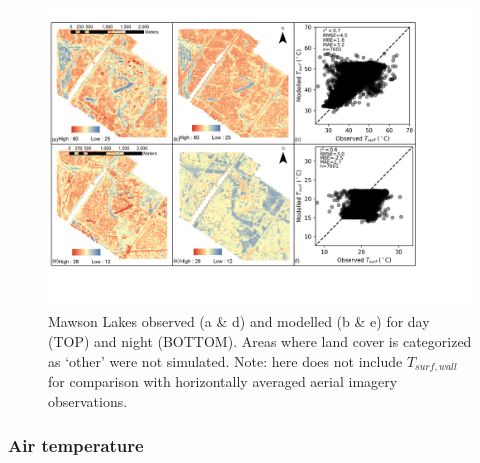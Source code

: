 \documentclass[final,3p,times,authoryear]{elsarticle}
\begin{document}
\begin{figure}
\includegraphics[width=1\textwidth]{figure5.png}
 \caption{Mawson Lakes  observed (a \& d)  and modelled (b \& e)  for day (TOP) and night (BOTTOM). Areas where land cover is categorized as `other' were not simulated. Note:  here does not include $T_{surf,wall}$ for comparison with horizontally averaged aerial imagery observations.} \label{fig:MawsonBase}
\end{figure}

 


\subsubsection*{Air temperature}\label{sec:airtempresult} 
\end{document}
